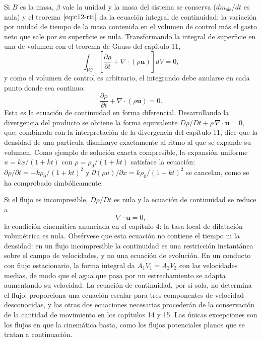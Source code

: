 \documentclass[10pt,openany]{book}
\begin{document}
Si \(B\) es la masa, \(\beta\) vale la unidad y la masa del sistema se conserva (\(dm_{\mathrm{sis}}/dt\) es nula) y el teorema \(\eqref{eq:c12-rtt}\) da la ecuación integral de continuidad: la variación por unidad de tiempo de la masa contenida en el volumen de control más el gasto neto que sale por su superficie es nula. Transformando la integral de superficie en una de volumen con el teorema de Gauss del capítulo 11,
\begin{equation}
\int_{VC}\left[\frac{\partial\rho}{\partial t} + \nabla\cdot(\rho\mathbf{u})\right] dV = 0, \label{eq:c12-cont-integral}
\end{equation}
y como el volumen de control es arbitrario, el integrando debe anularse en cada punto donde sea continuo:
\begin{equation}
\frac{\partial\rho}{\partial t} + \nabla\cdot(\rho\mathbf{u}) = 0. \label{eq:c12-continuidad}
\end{equation}
Esta es la ecuación de continuidad en forma diferencial. Desarrollando la divergencia del producto se obtiene la forma equivalente \(D\rho/Dt + \rho\,\nabla\cdot\mathbf{u} = 0\), que, combinada con la interpretación de la divergencia del capítulo 11, dice que la densidad de una partícula disminuye exactamente al ritmo al que se expande su volumen. Como ejemplo de solución exacta compresible, la expansión uniforme \(u = kx/(1 + kt)\) con \(\rho = \rho_0/(1 + kt)\) satisface la ecuación: \(\partial\rho/\partial t = -k\rho_0/(1 + kt)^{2}\) y \(\partial(\rho u)/\partial x = k\rho_0/(1 + kt)^{2}\) se cancelan, como se ha comprobado simbólicamente.

Si el flujo es incompresible, \(D\rho/Dt\) es nula y la ecuación de continuidad se reduce a
\begin{equation}
\nabla\cdot\mathbf{u} = 0, \label{eq:c12-incompresible}
\end{equation}
la condición cinemática anunciada en el capítulo 4: la tasa local de dilatación volumétrica es nula. Obsérvese que esta ecuación no contiene el tiempo ni la densidad: en un flujo incompresible la continuidad es una restricción instantánea sobre el campo de velocidades, y no una ecuación de evolución. En un conducto con flujo estacionario, la forma integral da \(A_1 V_1 = A_2 V_2\) con las velocidades medias, de modo que el agua que pasa por un estrechamiento se adapta aumentando su velocidad. La ecuación de continuidad, por sí sola, no determina el flujo: proporciona una ecuación escalar para tres componentes de velocidad desconocidas, y las otras dos ecuaciones necesarias procederán de la conservación de la cantidad de movimiento en los capítulos 14 y 15. Las únicas excepciones son los flujos en que la cinemática basta, como los flujos potenciales planos que se tratan a continuación.
\end{document}
